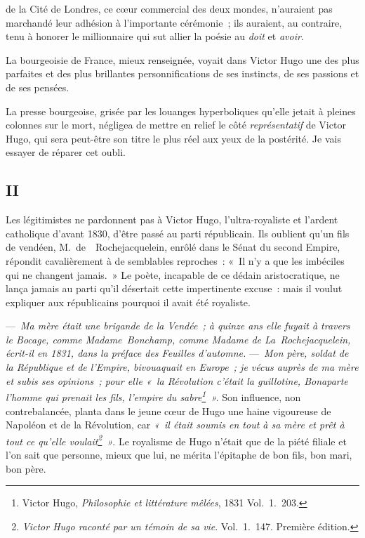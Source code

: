 \documentclass[french,twoside]{book} %
\begin{document}
\label{p8}de la Cité de Londres, ce cœur commercial des deux mondes, n’auraient pas marchandé leur adhésion à l’importante cérémonie ; ils auraient, au contraire, tenu à honorer le millionnaire qui sut allier la poésie au {\itshape doit} et {\itshape avoir}.\par
La bourgeoisie de France, mieux renseignée, voyait dans Victor Hugo une des plus parfaites et des plus brillantes personnifications de ses instincts, de ses passions et de ses pensées.\par
La presse bourgeoise, grisée par les louanges hyperboliques qu’elle jetait à pleines colonnes sur le mort, négligea de mettre en relief le côté {\itshape représentatif} de Victor Hugo, qui sera peut-être son titre le plus réel aux yeux de la postérité. Je vais essayer de réparer cet oubli.
\subsection[{II}]{II}
\noindent Les légitimistes ne pardonnent pas à Victor Hugo, l’ultra-royaliste et l’ardent catholique d’avant 1830, d’être passé au parti républicain. Ils oublient qu’un fils de vendéen, M. de  Rochejacquelein, enrôlé dans le Sénat du second Empire, répondit cavalièrement à de semblables reproches : « Il n’y a que les imbéciles qui ne changent jamais. » Le poète, incapable de ce dédain aristocratique, ne lança jamais au parti qu’il désertait cette impertinente excuse : mais il voulut expliquer aux républicains pourquoi il avait été royaliste.\par
— \emph{Ma mère était une {\itshape brigande} de la Vendée ; à quinze ans elle fuyait à travers le Bocage, comme Madame Bonchamp, comme Madame de  
\label{p9}La Rochejacquelein, écrit-il en 1831, dans la préface des \emph{Feuilles d’automne}.} — \emph{Mon père, soldat de la République et de l’Empire, bivouaquait en Europe ; je vécus auprès de ma mère et subis ses opinions ; pour elle « la Révolution c’était la guillotine, Bonaparte l’homme qui prenait les fils, l’empire du sabre\footnote{Victor Hugo, \emph{Philosophie et littérature mêlées}, 1831 Vol. 1. 203.} ».} Son influence, non contrebalancée, planta dans le jeune cœur de Hugo une haine vigoureuse de Napoléon et de la Révolution, car \emph{« il était soumis en tout à sa mère et prêt à tout ce qu’elle voulait\footnote{\emph{Victor Hugo raconté par un témoin de sa vie}. Vol. 1. 147. Première édition.} »}. Le royalisme de Hugo n’était que de la piété filiale et l’on sait que personne, mieux que lui, ne mérita l’épitaphe de bon fils, bon mari, bon père.\par
\end{document}
